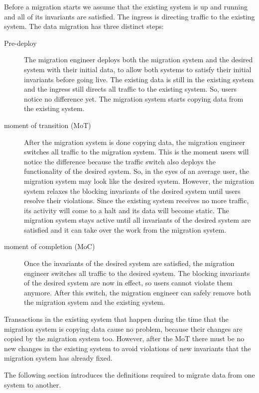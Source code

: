 \documentclass[runningheads]{llncs}
\begin{document}
   Before a migration starts we assume that the existing system is up and running and all of its invariants are satisfied.
   The ingress is directing traffic to the existing system.
   The data migration has three distinct steps:
\begin{description}
\item[Pre-deploy]
      The migration engineer deploys both the migration system and the desired system with their initial data,
      to allow both systems to satisfy their initial invariants before going live.
      The existing data is still in the existing system and the ingress still directs all traffic to the existing system.
      So, users notice no difference yet.
      The migration system starts copying data from the existing system.
\item[moment of transition (MoT)]
      After the migration system is done copying data, the migration engineer switches all traffic to the migration system.
      This is the moment users will notice the difference because the traffic switch also deploys the functionality of the desired system.
      So, in the eyes of an average user, the migration system may look like the desired system.
      However, the migration system relaxes the blocking invariants of the desired system until users resolve their violations.
      Since the existing system receives no more traffic, its activity will come to a halt and its data will become static.
      The migration system stays active until all invariants of the desired system are satisfied and it can take over the work from the migration system.
\item[moment of completion (MoC)]
      Once the invariants of the desired system are satisfied, the migration engineer switches all traffic to the desired system.
      The blocking invariants of the desired system are now in effect, so users cannot violate them anymore.
      After this switch, the migration engineer can safely remove both the migration system and the existing system.
\end{description}

   Transactions in the existing system that happen during the time that the migration system is copying data cause no problem,
   because their changes are copied by the migration system too.
   However, after the MoT there must be no new changes in the existing system
   to avoid violations of new invariants that the migration system has already fixed.

   The following section introduces the definitions required to migrate data from one system to another.
\end{document}
